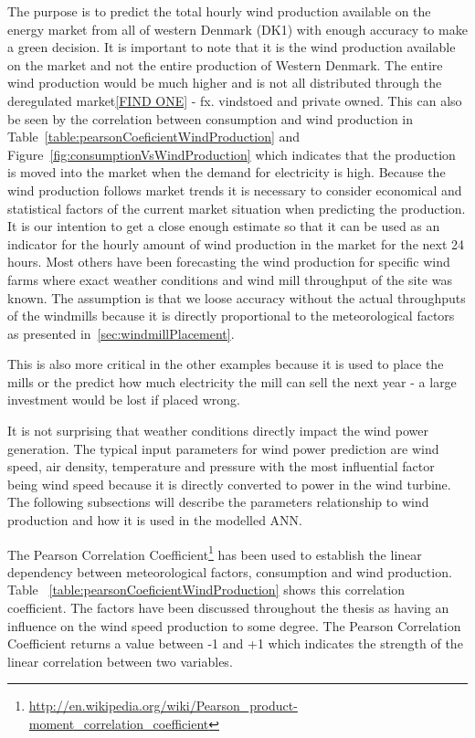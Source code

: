 The purpose is to predict the total hourly wind production available on the energy market from all of western Denmark (DK1) with enough accuracy to make a green decision. It is important to note that it is the wind production available on the market and not the entire production of Western Denmark. The entire wind production would be much higher and is not all distributed through the deregulated market\ref{FIND ONE} - fx. vindstoed and private owned. This can also be seen by the correlation between consumption and wind production in Table~\ref{table:pearsonCoeficientWindProduction} and Figure~\ref{fig:consumptionVsWindProduction} which indicates that the production is moved into the market when the demand for electricity is high. Because the wind production follows market trends it is necessary to consider economical and statistical factors of the current market situation when predicting the production. It is our intention to get a close enough estimate so that it can be used as an indicator for the hourly amount of wind production in the market for the next 24 hours.
Most others have been forecasting the wind production for specific wind farms where exact weather conditions and wind mill throughput of the site was known. The assumption is that we loose accuracy without the actual throughputs of the windmills because it is directly proportional to the meteorological factors as presented in~\ref{sec:windmillPlacement}. 

This is also more critical in the other examples because it is used to place the mills or the predict how much electricity the mill can sell the next year - a large investment would be lost if placed wrong. 

It is not surprising that weather conditions directly impact the wind power generation. The typical input parameters for wind power prediction are wind speed, air density, temperature and pressure \cite{WindPowerGenerationUsingANN} with the most influential factor being wind speed because it is directly converted to power in the wind turbine. The following subsections will describe the parameters relationship to wind production and how it is used in the modelled ANN.

The Pearson Correlation Coefficient\footnote{\url{http://en.wikipedia.org/wiki/Pearson_product-moment_correlation_coefficient}} has been used to establish the linear dependency between meteorological factors, consumption and wind production. Table ~\ref{table:pearsonCoeficientWindProduction} shows this correlation coefficient. The factors have been discussed throughout the thesis as having an influence on the wind speed production to some degree. The Pearson Correlation Coefficient returns a value between -1 and +1 which indicates the strength of the linear correlation between two variables.

